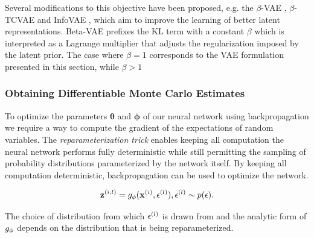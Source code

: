 Several modifications to this objective have been proposed, e.g. the $\beta$-VAE \cite{beta_vae, understanding_beta_vae}, $\beta$-TCVAE \cite{beta_tcvae} and InfoVAE \cite{infovae}, which aim to improve the learning of better latent representations. Beta-VAE prefixes the KL term with a constant $\beta$ which is interpreted as a Lagrange multiplier that adjusts the regularization imposed by the latent prior. The case where $\beta = 1$ corresponds to the VAE formulation presented in this section, while $\beta > 1$ 

\subsubsection{Obtaining Differentiable Monte Carlo Estimates}

To optimize the parameters $\mathbf{\theta}$ and $\mathbf{\phi}$ of our neural network using backpropagation we require a way to compute the gradient of the expectations of random variables. The \textit{reparameterization trick} enables keeping all computation the neural network performs fully deterministic while still permitting the sampling of probability distributions parameterized by the network itself. By keeping all computation deterministic, backpropagation can be used to optimize the network.


$$\mathbf{z}^{(i,l)} = g_{\mathbf{\phi}}(\mathbf{x}^{(i)}, \mathbf{\epsilon}^{(l)}), \mathbf{\epsilon}^{(l)} \sim p(\mathbf{\epsilon}).$$

The choice of distribution from which $\mathbf{\epsilon}^{(l)}$ is drawn from and the analytic form of $g_{\mathbf{\phi}}$ depends on the distribution that is being reparameterized. 

